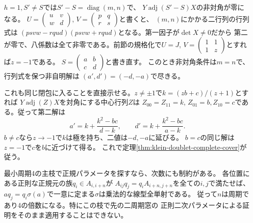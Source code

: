 $h=1,S'\ne S$では$S'-S=\operatorname{diag}(m,n)$で、
$Y\operatorname{adj}(S'-S)X$の非対角が零になる。
$U=\left(\begin{smallmatrix}u&v\\w&d\end{smallmatrix}\right)$,
$V=\left(\begin{smallmatrix}p&q\\r&s\end{smallmatrix}\right)$と書くと、
$(m,n)$にかかる二行列の行列式は
$(psvw-rqud)(psvw+rqud)$となる。第一因子が$\det X\ne0$だから
第二が零で、八係数は全て非零である。前節の規格化で$U=J$,
$V=\left(\begin{smallmatrix}1&1\\1&z\end{smallmatrix}\right)$とすれば$z=-1$である。
$S=\left(\begin{smallmatrix}a&b\\c&d\end{smallmatrix}\right)$と書き直す。
このとき非対角条件は$m=n$で、行列式を保つ非自明解は
$(a',d')=(-d,-a)$で尽きる。

これも同じ閉包に入ることを直接示せる。$z\ne\pm1$で$k=(zb+c)/(z+1)$とすれば
$Y\operatorname{adj}(Z)X$を対角にする中心行列$Z$は
$Z_{00}=Z_{11}=k$, $Z_{01}=b,Z_{10}=c$である。従って第二解は
\[
 a'=k+\frac{k^2-bc}{d-k},\qquad d'=k+\frac{k^2-bc}{a-k}.
\]
$b\ne c$なら$z\to-1$で$k$は極を持ち、二値は$-d,-a$に延びる。
$b=c$の同じ解は$z=-1$で$c$を$b$に近づけて得る。
これで定理\ref{thm:klein-doublet-complete-cover}が従う。

\begin{remark}
最小周期4の主枝で正規パラメータを探すなら、次数にも制約がある。
各位置にある正則な正規元の族$q_i\in A_{i,i+n}$が
$A_{ij}q_j=q_i A_{i+n,j+n}$を全ての$i,j$で満たせば、
$a q_j=q_i\sigma(a)$で一意に定まる$\sigma$は乗法的な線型全単射である。
従って$n$は周期であり4の倍数になる。特にこの枝で先の二周期窓の
正則二次パラメータによる証明をそのまま適用することはできない。
\end{remark}

